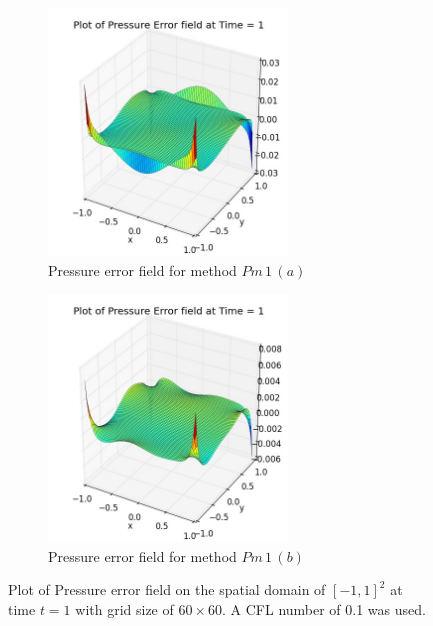 \begin{figure}[H]
	\centering
	\begin{subfigure}[t]{2.5in}
		\centering
		\includegraphics[width=2.5in]{figures/Pm1a_pf2_P_error_t_1_grid_60_cfl_0_1.jpg}
		\caption{Pressure error field for method $Pm\,1\,(a)$}\label{fig:6.7a}		
	\end{subfigure}
	\quad
	\begin{subfigure}[t]{2.5in}
		\centering
		\includegraphics[width=2.5in]{figures/Pm1b_pf2_P_error_t_1_grid_60_cfl_0_1.jpg}
		\caption{Pressure error field for method $Pm\,1\,(b)$}\label{fig:6.7b}
	\end{subfigure}
	\caption{Plot of Pressure error field on the spatial domain of $[-1,1]^2$ at time $t=1$ with grid size of $60 \times 60$. A CFL number of 0.1 was used.}\label{fig:6.7}
\end{figure}

